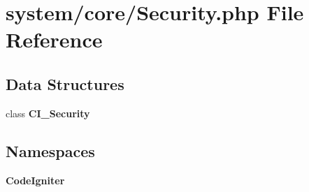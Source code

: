 \section{system/core/\-Security.php File Reference}
\label{_security_8php}
\subsection*{Data Structures}
\begin{DoxyCompactItemize}
\item 
class {\bf C\-I\-\_\-\-Security}
\end{DoxyCompactItemize}
\subsection*{Namespaces}
\begin{DoxyCompactItemize}
\item 
{\bf Code\-Igniter}
\end{DoxyCompactItemize}
